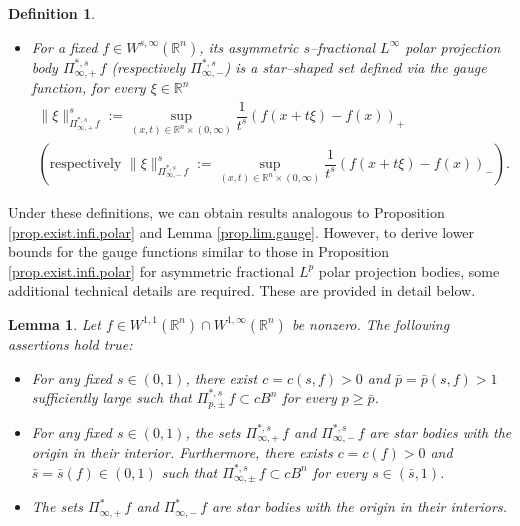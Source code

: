 \documentclass[11pt, reqno]{article}
\newtheorem{definition}[theorem]{Definition}
\newtheorem{lemma}[theorem]{Lemma}
\theoremstyle{definition}
\numberwithin{equation}{section}
\newcommand{\R}{\mathbb{R}}
\begin{document}
\begin{definition}
\begin{itemize}
	\item[$\bullet$] For a fixed $f \in W^{s, \infty}(\R^n)$, its asymmetric $s$--fractional $L^\infty$ polar projection body $\Pi^{\ast, s}_{\infty, +} \, f$ (respectively $\Pi^{\ast, s}_{\infty, -}$) is a star--shaped set defined via the gauge function, for every $\xi \in \R^n$
        \begin{align*}
            \| \xi \|_{\Pi^{\ast, s}_{\infty, +} \, f}^s 
            := \sup_{(x, t) \in \R^n \times (0, \infty)} 
            \dfrac{1}{t^s} (f(x + t\xi) - f(x))_+ \\
            \left( \text{respectively } 
            \| \xi \|_{\Pi^{\ast, s}_{\infty, -} \, f}^s 
            := \sup_{(x, t) \in \R^n \times (0, \infty)} 
            \dfrac{1}{t^s} (f(x + t\xi) - f(x))_- \right).
        \end{align*}
    \end{itemize}
\end{definition}

Under these definitions, we can obtain results analogous to Proposition \ref{prop.exist.infi.polar} and Lemma \ref{prop.lim.gauge}.
However, to derive lower bounds for the gauge functions similar to those in Proposition \ref{prop.exist.infi.polar} for asymmetric fractional $L^p$ polar projection bodies, some additional technical details are required.
These are provided in detail below.

\begin{lemma}\label{lem.exist.pm}
Let $f \in W^{1, 1}(\R^n) \cap W^{1, \infty}(\R^n)$ be nonzero.
The following assertions hold true:
	 \begin{itemize}
        \item[(i)] 
        For any fixed $s \in (0, 1)$, there exist $c = c(s, f) > 0$ and $\bar p = \bar p(s, f) > 1$ sufficiently large such that $\Pi^{\ast, s}_{p, \pm} \, f \subset c B^n$ for every $p \geq \bar p$. 
        
        \item[(ii)] 
        For any fixed $s \in (0, 1)$, the sets $\Pi^{\ast, s}_{\infty, +} \, f$ and $\Pi^{\ast, s}_{\infty, -} \, f$ are star bodies with the origin in their interior.
        Furthermore, there exists $c = c(f) > 0$ and $\bar s = \bar s(f) \in (0, 1)$ such that $\Pi^{\ast, s}_{\infty, \pm} \, f \subset c B^n$ for every $s \in (\bar s, 1)$.

        \item[(iii)]
        The sets $\Pi^{\ast}_{\infty, +} \, f$ and $\Pi^{\ast}_{\infty, -} \, f$ are star bodies with the origin in their interiors.
    \end{itemize}
\end{lemma}
\end{document}

